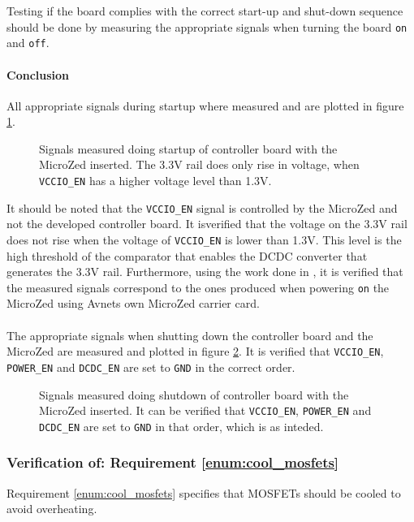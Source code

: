 Testing if the board complies with the correct start-up and shut-down sequence should be done by measuring the appropriate signals when turning the board \texttt{on} and \texttt{off}.

\paragraph{Conclusion}
All appropriate signals during startup where measured and are plotted in figure \ref{fig:controllerboardv2_startup}.
\begin{figure}[H]
	\centering
	\caption[Signals measured doing startup of controller board.]{Signals measured doing startup of controller board with the MicroZed inserted. The 3.3V rail does only rise in voltage, when \texttt{VCCIO\_EN} has a higher voltage level than 1.3V.}
	\label{fig:controllerboardv2_startup}
\end{figure}
It should be noted that the \texttt{VCCIO\_EN} signal is controlled by the MicroZed and not the developed controller board. 
It isverified that the voltage on the 3.3V rail does not rise when the voltage of \texttt{VCCIO\_EN} is lower than 1.3V.
This level is the high threshold of the comparator that enables the DCDC converter that generates the 3.3V rail.
Furthermore, using the work done in \cite{isaswarm}, it is verified that the measured signals correspond to the ones produced when powering \texttt{on} the MicroZed using Avnets own MicroZed carrier card.
\\~\\
The appropriate signals when shutting down the controller board and the MicroZed are measured and plotted in figure \ref{fig:controllerboardv2_shutdown}.
It is verified that \texttt{VCCIO\_EN}, \texttt{POWER\_EN} and \texttt{DCDC\_EN} are set to \texttt{GND} in the correct order. 
\begin{figure}[H]
	\centering
	\caption[Signals measured doing shutdown of controller board.]{Signals measured doing shutdown of controller board with the MicroZed inserted. It can be verified that \texttt{VCCIO\_EN}, \texttt{POWER\_EN} and \texttt{DCDC\_EN} are set to \texttt{GND} in that order, which is as inteded.}
	\label{fig:controllerboardv2_shutdown}
\end{figure}

\subsubsection{Verification of: Requirement \ref{enum:cool_mosfets}} %
\label{ssub:requirement_ref_enum:cool_mosfets}
Requirement \ref{enum:cool_mosfets} specifies that MOSFETs should be cooled to avoid overheating. 

